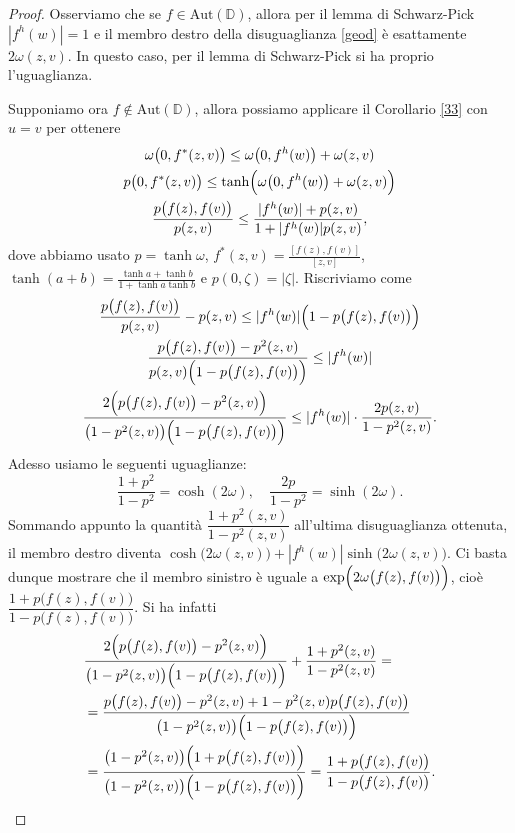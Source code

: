 \begin{proof}
  Osserviamo che se $f \in \text{Aut}(\mathbb{D})$, allora per il lemma di Schwarz-Pick $|f^h(w)|=1$ e il membro destro della disuguaglianza \eqref{geod} è esattamente $2\omega(z,v)$. In questo caso, per il lemma di Schwarz-Pick si ha proprio l'uguaglianza.

  Supponiamo ora $f \not\in \text{Aut}(\mathbb{D})$, allora possiamo applicare il Corollario \ref{33} con $u=v$ per ottenere
  \begin{gather*}
    \omega\bigl(0,f^*(z,v)\bigr) \le \omega\bigl(0,f^h(w)\bigr)+\omega(z,v) \\
    p\bigl(0,f^*(z,v)\bigr) \le \tanh\Bigl(\omega\bigl(0,f^h(w)\bigr)+\omega(z,v)\Bigr) \\
    \frac{p\bigl(f(z),f(v)\bigr)}{p(z,v)} \le \frac{|f^h(w)|+p(z,v)}{1+|f^h(w)|p(z,v)},
  \end{gather*}
  dove abbiamo usato $p=\tanh\omega$, $f^*(z,v)=\frac{[f(z),f(v)]}{[z,v]}$, $\tanh(a+b)=\frac{\tanh{a}+\tanh{b}}{1+\tanh{a}\tanh{b}}$ e $p(0,\zeta)=|\zeta|$. Riscriviamo come
  \begin{gather*}
    \frac{p\bigl(f(z),f(v)\bigr)}{p(z,v)}-p(z,v) \le |f^h(w)|\Bigl(1-p\bigl(f(z),f(v)\bigr)\Bigr) \\
    \frac{p\bigl(f(z),f(v)\bigr)-p^2(z,v)}{p(z,v)\Bigl(1-p\bigl(f(z),f(v)\bigr)\Bigr)} \le |f^h(w)| \\
    \frac{2\Bigl(p\bigl(f(z),f(v)\bigr)-p^2(z,v)\Bigr)}{\bigl(1-p^2(z,v)\bigr)\Bigl(1-p\bigl(f(z),f(v)\bigr)\Bigr)} \le |f^h(w)|\cdot \frac{2p(z,v)}{1-p^2(z,v)}.
  \end{gather*}
  Adesso usiamo le seguenti uguaglianze:
  $$\frac{1+p^2}{1-p^2}=\cosh(2\omega), \quad \frac{2p}{1-p^2}=\sinh(2\omega).$$
  Sommando appunto la quantità $\dfrac{1+p^2(z,v)}{1-p^2(z,v)}$ all'ultima disuguaglianza ottenuta, il membro destro diventa $\cosh\bigl(2\omega(z,v)\bigr)+|f^h(w)|\sinh\bigl(2\omega(z,v)\bigr)$. Ci basta dunque mostrare che il membro sinistro è uguale a $\exp\Bigl(2\omega\bigl(f(z),f(v)\bigr)\Bigr)$, cioè $\dfrac{1+p\bigl(f(z),f(v)\bigr)}{1-p\bigl(f(z),f(v)\bigr)}$. Si ha infatti
  \begin{align*}
    & \frac{2\Bigl(p\bigl(f(z),f(v)\bigr)-p^2(z,v)\Bigr)}{\bigl(1-p^2(z,v)\bigr)\Bigl(1-p\bigl(f(z),f(v)\bigr)\Bigr)}+\frac{1+p^2(z,v)}{1-p^2(z,v)}= \\
    & = \frac{p\bigl(f(z),f(v)\bigr)-p^2(z,v)+1-p^2(z,v)p\bigl(f(z),f(v)\bigr)}{\bigl(1-p^2(z,v)\bigr)\Bigl(1-p\bigl(f(z),f(v)\bigr)\Bigr)} \\
    & = \frac{\bigl(1-p^2(z,v)\bigr)\Bigl(1+p\bigl(f(z),f(v)\bigr)\Bigr)}{\bigl(1-p^2(z,v)\bigr)\Bigl(1-p\bigl(f(z),f(v)\bigr)\Bigr)}=\frac{1+p\bigl(f(z),f(v)\bigr)}{1-p\bigl(f(z),f(v)\bigr)}.
  \end{align*}
\end{proof}

